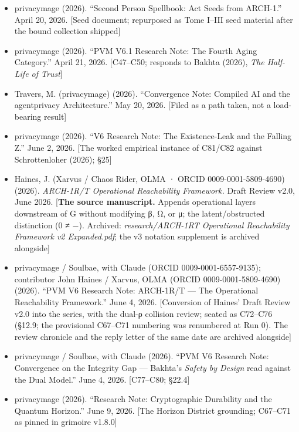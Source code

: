 \documentclass[
  11pt,
]{article}
\begin{document}
\begin{itemize}
  privacymage (2026). ``PVM V6 Research Note: The Wound and the Cap ---
  Convergence at the Bijective Boundary.'' April 18, 2026 (locked-in May
  9). {[}C34--C37{]}
\item
  privacymage (2026). ``Second Person Spellbook: Act Seeds from
  ARCH-1.'' April 20, 2026. {[}Seed document; repurposed as Tome I--III
  seed material after the bound collection shipped{]}
\item
  privacymage (2026). ``PVM V6.1 Research Note: The Fourth Aging
  Category.'' April 21, 2026. {[}C47--C50; responds to Bakhta (2026),
  \emph{The Half-Life of Trust}{]}
\item
  Travers, M. (privacymage) (2026). ``Convergence Note: Compiled AI and
  the agentprivacy Architecture.'' May 20, 2026. {[}Filed as a path
  taken, not a load-bearing result{]}
\item
  privacymage (2026). ``V6 Research Note: The Existence-Leak and the
  Falling Z.'' June 2, 2026. {[}The worked empirical instance of C81/C82
  against Schrottenloher (2026); §25{]}
\item
  Haines, J. (Xarvus / Chaos Rider, OLMA · ORCID 0009-0001-5809-4690)
  (2026). \emph{ARCH-1R/T Operational Reachability Framework.} Draft
  Review v2.0, June 2026. {[}\textbf{The source manuscript.} Appends
  operational layers downstream of G without modifying β, Ω, or μ; the
  latent/obstructed distinction (0 ≠ −). Archived:
  \emph{research/ARCH-1RT Operational Reachability Framework v2
  Expanded.pdf}; the v3 notation supplement is archived alongside{]}
\item
  privacymage / Soulbae, with Claude (ORCID 0009-0001-6557-9135);
  contributor John Haines / Xarvus, OLMA (ORCID 0009-0001-5809-4690)
  (2026). ``PVM V6 Research Note: ARCH-1R/T --- The Operational
  Reachability Framework.'' June 4, 2026. {[}Conversion of Haines' Draft
  Review v2.0 into the series, with the dual-ρ collision review; seated
  as C72--C76 (§12.9; the provisional C67--C71 numbering was renumbered
  at Run 0). The review chronicle and the reply letter of the same date
  are archived alongside{]}
\item
  privacymage / Soulbae, with Claude (2026). ``PVM V6 Research Note:
  Convergence on the Integrity Gap --- Bakhta's \emph{Safety by Design}
  read against the Dual Model.'' June 4, 2026. {[}C77--C80; §22.4{]}
\item
  privacymage (2026). ``Research Note: Cryptographic Durability and the
  Quantum Horizon.'' June 9, 2026. {[}The Horizon District grounding;
  C67--C71 as pinned in grimoire v1.8.0{]}
\end{itemize}
\end{document}
